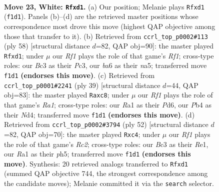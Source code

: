 \documentclass[11pt]{article}
\begin{document}
\clearpage

\begin{figure}[p]\centering
\begin{subfigure}{0.46\textwidth}\centering
\resizebox{\linewidth}{!}{%
\newchessgame
\chessboard[
  setfen={rn2k1r1/p7/b5p1/5p2/1P5P/2B5/P3PP2/R2q1RK1 w q - 0 23},
  showmover=false,
  pgfstyle=straightmove, color=movearrow, markmove={f1-d1}
]}
\caption{}
\end{subfigure}\hfill
\begin{subfigure}{0.46\textwidth}\centering
\resizebox{\linewidth}{!}{%
\newchessgame
\chessboard[
  setfen={1r4k1/p4pbp/6p1/n4B2/P7/2P5/5PPP/R2q1RK1 w - - 0 30},
  showmover=false,
  pgfstyle=straightmove, color=movearrow, markmove={f1-d1}
]}
\caption{}
\end{subfigure}
\\[4pt]
\begin{subfigure}{0.46\textwidth}\centering
\resizebox{\linewidth}{!}{%
\newchessgame
\chessboard[
  setfen={r1Q2rk1/pp3pbp/3p4/8/3n3P/3N2P1/PP1B4/R4R1K b - - 0 20},
  showmover=false,
  pgfstyle=straightmove, color=movearrow, markmove={a8-c8}
]}
\caption{}
\end{subfigure}\hfill
\begin{subfigure}{0.46\textwidth}\centering
\resizebox{\linewidth}{!}{%
\newchessgame
\chessboard[
  setfen={2r1r1k1/2p3p1/p3Pp2/7p/2q4P/8/PPR3P1/2K1R3 w - - 0 27},
  showmover=false,
  pgfstyle=straightmove, color=movearrow, markmove={c2-c4}
]}
\caption{}
\end{subfigure}
\caption{\textbf{Move 23, White: \texttt{Rfxd1}.} (a) Our position; Melanie plays \texttt{Rfxd1} (\texttt{f1d1}). Panels (b)--(d) are the retrieved master positions whose correspondence most drove this move (highest QAP objective among those that transfer to it). (b) Retrieved from \texttt{ccrl\_top\_p0002\#113} (ply 58) [structural distance $d$=82, QAP obj=90]: the master played \texttt{Rfxd1}; under $\mu$ our \emph{Rf1} plays the role of that game's \emph{Rf1}; cross-type roles: our \emph{B}c3 as their \emph{P}c3, our \emph{b}a6 as their \emph{n}a5; transferred move \texttt{f1d1} \textbf{(endorses this move)}. (c) Retrieved from \texttt{ccrl\_top\_p0001\#2241} (ply 39) [structural distance $d$=44, QAP obj=83]: the master played \texttt{Raxc8}; under $\mu$ our \emph{Rf1} plays the role of that game's \emph{Ra1}; cross-type roles: our \emph{R}a1 as their \emph{P}d6, our \emph{P}b4 as their \emph{N}d4; transferred move \texttt{f1d1} \textbf{(endorses this move)}. (d) Retrieved from \texttt{ccrl\_top\_p0002\#3794} (ply 52) [structural distance $d$=82, QAP obj=70]: the master played \texttt{Rxc4}; under $\mu$ our \emph{Rf1} plays the role of that game's \emph{Rc2}; cross-type roles: our \emph{B}c3 as their \emph{R}e1, our \emph{R}a1 as their \emph{p}h5; transferred move \texttt{f1d1} \textbf{(endorses this move)}. Synthesis: 20 retrieved analogs transferred to \texttt{Rfxd1} (summed QAP objective 744, the strongest correspondence among the candidate moves); Melanie committed it via the \texttt{search} selector.}
\label{fig:thought-m44}
\end{figure}
\end{document}
